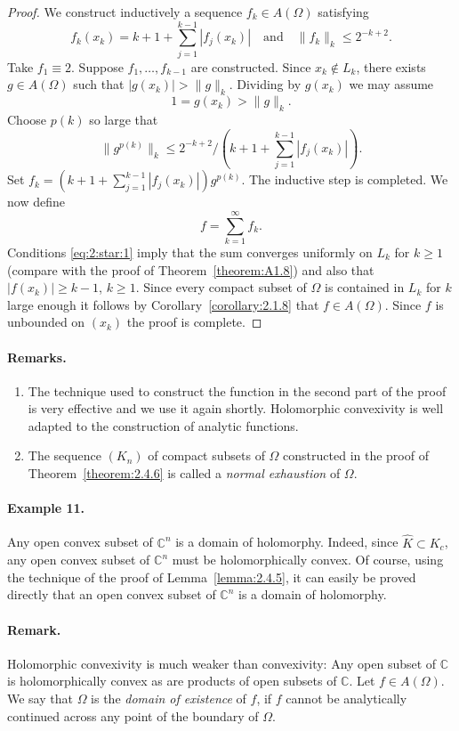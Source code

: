\begin{proof}
We construct inductively a sequence $f_k\in A(\Omega)$ satisfying
\[f_k(x_k)=k+1+\sum_{j=1}^{k-1}|f_j(x_k)|\quad\text{and}\quad\|f_k\|_k\leq2^{-k+2}.\tag{*}\label{eq:2:star:1}\]
Take $f_1\equiv2$. Suppose $f_1,\ldots,f_{k-1}$ are constructed. Since $x_k\notin L_k$, there exists $g\in A(\Omega)$ such that $|g(x_k)|>\|g\|_k$. Dividing by $g(x_k)$ we may assume
\[1=g(x_k)>\|g\|_k.\]
Choose $p(k)$ so large that
\[\|g^{p(k)}\|_k\leq2^{-k+2}/\left(k+1+\sum_{j=1}^{k-1}|f_j(x_k)|\right).\]
Set $f_k=(k+1+\sum_{j=1}^{k-1}|f_j(x_k)|)g^{p(k)}$. The inductive step is completed. We now define
\[f=\sum_{k=1}^\infty f_k.\]
Conditions \eqref{eq:2:star:1} imply that the sum converges uniformly on $L_k$ for $k\geq1$ (compare with the proof of Theorem~\ref{theorem:A1.8}) and also that $|f(x_k)|\geq k-1$, $k\geq1$. Since every compact subset of $\Omega$ is contained in $L_k$ for $k$ large enough it follows by Corollary~\ref{corollary:2.1.8} that $f\in A(\Omega)$. Since $f$ is unbounded on $(x_k)$ the proof is complete.
\end{proof}
\paragraph*{Remarks.}
\begin{enumerate}
\item The technique used to construct the function in the second part of the proof is very effective and we use it again shortly. Holomorphic convexivity is well adapted to the construction of analytic functions.
\item The sequence $(K_n)$ of compact subsets of $\Omega$ constructed in the proof of Theorem~\ref{theorem:2.4.6} is called a \emph{normal exhaustion} of $\Omega$.
\end{enumerate}
\paragraph*{Example 11.} Any open convex subset of $\mathbb C^n$ is a domain of holomorphy. Indeed, since $\widehat K\subset K_c$, any open convex subset of $\mathbb C^n$ must be holomorphically convex. Of course, using the technique of the proof of Lemma~\ref{lemma:2.4.5}, it can easily be proved directly that an open convex subset of $\mathbb C^n$ is a domain of holomorphy.
\paragraph*{Remark.} Holomorphic convexivity is much weaker than convexivity: Any open subset of $\mathbb C$ is holomorphically convex as are products of open subsets of $\mathbb C$.
 Let $f\in A(\Omega)$. We say that $\Omega$ is the \emph{domain of existence} of $f$, if $f$ cannot be analytically continued across any point of the boundary of $\Omega$.
